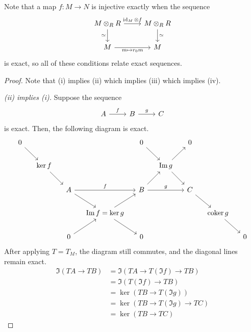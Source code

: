 Note that a map \( f : M \to N \) is injective exactly when the sequence
\[\begin{tikzcd}
	{M \otimes_R R} & {M \otimes_R R} \\
	M & M
	\arrow["{\id_M \otimes f}", from=1-1, to=1-2]
	\arrow["\simeq", from=1-2, to=2-2]
	\arrow["\simeq"', from=1-1, to=2-1]
	\arrow["{m \mapsto r_0 m}"', from=2-1, to=2-2]
\end{tikzcd}\]
is exact, so all of these conditions relate exact sequences.
\begin{proof}
    Note that (i) implies (ii) which implies (iii) which implies (iv).

    \emph{(ii) implies (i).}
    Suppose the sequence
\[\begin{tikzcd}
	A & B & C
	\arrow["f", from=1-1, to=1-2]
	\arrow["g", from=1-2, to=1-3]
\end{tikzcd}\]
    is exact.
    Then, the following diagram is exact.
\[\begin{tikzcd}[column sep=small]
	0 &&&& 0 && 0 \\
	& {\ker f} &&&& {\Im g} \\
	&& A && B && C \\
	&&& {\Im f = \ker g} &&&& {\coker g} \\
	&& 0 && 0 &&&& 0
	\arrow["f", from=3-3, to=3-5]
	\arrow["g", from=3-5, to=3-7]
	\arrow[from=2-2, to=3-3]
	\arrow[from=3-3, to=4-4]
	\arrow[from=4-4, to=5-5]
	\arrow[from=1-1, to=2-2]
	\arrow[from=5-3, to=4-4]
	\arrow[from=4-4, to=3-5]
	\arrow[from=3-5, to=2-6]
	\arrow[from=2-6, to=1-7]
	\arrow[from=1-5, to=2-6]
	\arrow[from=2-6, to=3-7]
	\arrow[from=3-7, to=4-8]
	\arrow[from=4-8, to=5-9]
\end{tikzcd}\]
    After applying \( T = T_M \), the diagram still commutes, and the diagonal lines remain exact.
    \begin{align*}
        \Im(TA \to TB) &= \Im(TA \to T(\Im f) \to TB) \\
        &= \Im (T(\Im f) \to TB) \\
        &= \ker (TB \to T(\Im g)) \\
        &= \ker (TB \to T(\Im g) \to TC) \\
        &= \ker (TB \to TC)
    \end{align*}


\end{proof}
